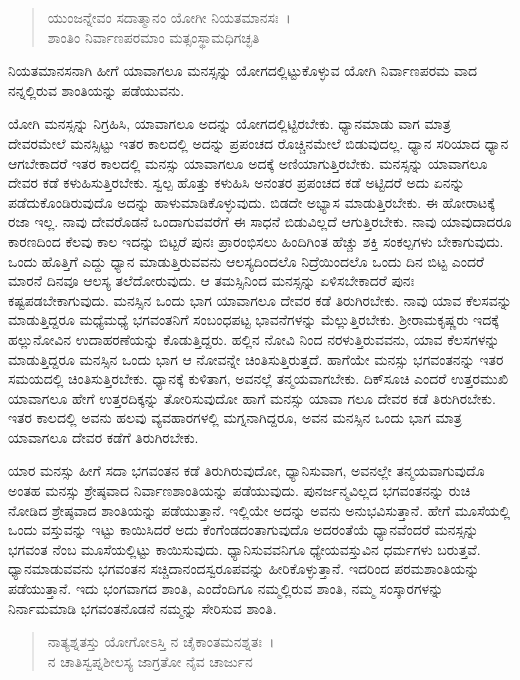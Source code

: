 \begin{verse}
ಯುಂಜನ್ನೇವಂ ಸದಾತ್ಮಾನಂ ಯೋಗೀ ನಿಯತಮಾನಸಃ~।\\ಶಾಂತಿಂ ನಿರ್ವಾಣಪರಮಾಂ ಮತ್ಸಂಸ್ಥಾಮಧಿಗಚ್ಛತಿ 
\end{verse}

{\small ನಿಯತಮಾನಸನಾಗಿ ಹೀಗೆ ಯಾವಾಗಲೂ ಮನಸ್ಸನ್ನು ಯೋಗದಲ್ಲಿಟ್ಟುಕೊಳ್ಳುವ ಯೋಗಿ ನಿರ್ವಾಣಪರಮ ವಾದ ನನ್ನಲ್ಲಿರುವ ಶಾಂತಿಯನ್ನು ಪಡೆಯುವನು.}

ಯೋಗಿ ಮನಸ್ಸನ್ನು ನಿಗ್ರಹಿಸಿ, ಯಾವಾಗಲೂ ಅದನ್ನು ಯೋಗದಲ್ಲಿಟ್ಟಿರಬೇಕು. ಧ್ಯಾನಮಾಡು ವಾಗ ಮಾತ್ರ ದೇವರಮೇಲೆ ಮನಸ್ಸಿಟ್ಟು ಇತರ ಕಾಲದಲ್ಲಿ ಅದನ್ನು ಪ್ರಪಂಚದ ರೊಚ್ಚಿನಮೇಲೆ ಬಿಡುವುದಲ್ಲ. ಧ್ಯಾನ ಸರಿಯಾದ ಧ್ಯಾನ ಆಗಬೇಕಾದರೆ ಇತರ ಕಾಲದಲ್ಲಿ ಮನಸ್ಸು ಯಾವಾಗಲೂ ಅದಕ್ಕೆ ಅಣಿಯಾಗುತ್ತಿರಬೇಕು. ಮನಸ್ಸನ್ನು ಯಾವಾಗಲೂ ದೇವರ ಕಡೆ ಕಳುಹಿಸುತ್ತಿರಬೇಕು. ಸ್ವಲ್ಪ ಹೊತ್ತು ಕಳುಹಿಸಿ ಅನಂತರ ಪ್ರಪಂಚದ ಕಡೆ ಅಟ್ಟಿದರೆ ಅದು ಏನನ್ನು ಪಡೆದುಕೊಂಡಿರುವುದೊ ಅದನ್ನು ಹಾಳುಮಾಡಿಕೊಳ್ಳುವುದು. ಬಿಡದೇ ಅಭ್ಯಾಸ ಮಾಡುತ್ತಿರಬೇಕು. ಈ ಹೋರಾಟಕ್ಕೆ ರಜಾ ಇಲ್ಲ. ನಾವು ದೇವರೊಡನೆ ಒಂದಾಗುವವರೆಗೆ ಈ ಸಾಧನೆ ಬಿಡುವಿಲ್ಲದೆ ಆಗುತ್ತಿರಬೇಕು. ನಾವು ಯಾವುದಾದರೂ ಕಾರಣದಿಂದ ಕೆಲವು ಕಾಲ ಇದನ್ನು ಬಿಟ್ಟರೆ ಪುನಃ ಪ್ರಾರಂಭಿಸಲು ಹಿಂದಿಗಿಂತ ಹೆಚ್ಚು ಶಕ್ತಿ ಸಂಕಲ್ಪಗಳು ಬೇಕಾಗುವುದು. ಒಂದು ಹೊತ್ತಿಗೆ ಎದ್ದು ಧ್ಯಾನ ಮಾಡುತ್ತಿರುವವನು ಆಲಸ್ಯದಿಂದಲೊ ನಿದ್ರೆಯಿಂದಲೊ ಒಂದು ದಿನ ಬಿಟ್ಟ ಎಂದರೆ ಮಾರನೆ ದಿನವೂ ಆಲಸ್ಯ ತಲೆದೋರುವುದು. ಆ ತಮಸ್ಸಿನಿಂದ ಮನಸ್ಸನ್ನು ಏಳಿಸಬೇಕಾದರೆ ಪುನಃ ಕಷ್ಟಪಡಬೇಕಾಗುವುದು. ಮನಸ್ಸಿನ ಒಂದು ಭಾಗ ಯಾವಾಗಲೂ ದೇವರ ಕಡೆ ತಿರುಗಿರಬೇಕು. ನಾವು ಯಾವ ಕೆಲಸವನ್ನು ಮಾಡುತ್ತಿದ್ದರೂ ಮಧ್ಯೆಮಧ್ಯೆ ಭಗವಂತನಿಗೆ ಸಂಬಂಧಪಟ್ಟ ಭಾವನೆಗಳನ್ನು ಮೆಲ್ಲುತ್ತಿರಬೇಕು. ಶ‍್ರೀರಾಮಕೃಷ್ಣರು ಇದಕ್ಕೆ ಹಲ್ಲುನೋವಿನ ಉದಾಹರಣೆಯನ್ನು ಕೊಡುತ್ತಿದ್ದರು. ಹಲ್ಲಿನ ನೋವಿ ನಿಂದ ನರಳುತ್ತಿರುವವನು, ಯಾವ ಕೆಲಸಗಳನ್ನು ಮಾಡುತ್ತಿದ್ದರೂ ಮನಸ್ಸಿನ ಒಂದು ಭಾಗ ಆ ನೋವನ್ನೇ ಚಿಂತಿಸುತ್ತಿರುತ್ತದೆ. ಹಾಗೆಯೇ ಮನಸ್ಸು ಭಗವಂತನನ್ನು ಇತರ ಸಮಯದಲ್ಲಿ ಚಿಂತಿಸುತ್ತಿರಬೇಕು. ಧ್ಯಾನಕ್ಕೆ ಕುಳಿತಾಗ, ಅವನಲ್ಲೆ ತನ್ಮಯವಾಗಬೇಕು. ದಿಕ್​ಸೂಚಿ ಎಂದರೆ ಉತ್ತರಮುಖಿ ಯಾವಾಗಲೂ ಹೇಗೆ ಉತ್ತರದಿಕ್ಕನ್ನು ತೋರಿಸುವುದೋ ಹಾಗೆ ಮನಸ್ಸು ಯಾವಾ ಗಲೂ ದೇವರ ಕಡೆ ತಿರುಗಿರಬೇಕು. ಇತರ ಕಾಲದಲ್ಲಿ ಅವನು ಹಲವು ವ್ಯವಹಾರಗಳಲ್ಲಿ ಮಗ್ನನಾಗಿದ್ದರೂ, ಅವನ ಮನಸ್ಸಿನ ಒಂದು ಭಾಗ ಮಾತ್ರ ಯಾವಾಗಲೂ ದೇವರ ಕಡೆಗೆ ತಿರುಗಿರಬೇಕು.

ಯಾರ ಮನಸ್ಸು ಹೀಗೆ ಸದಾ ಭಗವಂತನ ಕಡೆ ತಿರುಗಿರುವುದೋ, ಧ್ಯಾನಿಸುವಾಗ, ಅವನಲ್ಲೇ ತನ್ಮಯವಾಗುವುದೊ ಅಂತಹ ಮನಸ್ಸು ಶ್ರೇಷ್ಠವಾದ ನಿರ್ವಾಣಶಾಂತಿಯನ್ನು ಪಡೆಯುವುದು. ಪುನರ್ಜನ್ಮವಿಲ್ಲದ ಭಗವಂತನನ್ನು ರುಚಿ ನೋಡಿದ ಶ್ರೇಷ್ಠವಾದ ಶಾಂತಿಯನ್ನು ಪಡೆಯುತ್ತಾನೆ. ಇಲ್ಲಿಯೇ ಅದನ್ನು ಅವನು ಅನುಭವಿಸುತ್ತಾನೆ. ಹೇಗೆ ಮೂಸೆಯಲ್ಲಿ ಒಂದು ವಸ್ತುವನ್ನು ಇಟ್ಟು ಕಾಯಿಸಿದರೆ ಅದು ಕೆಂಗೆಂಡದಂತಾಗುವುದೊ ಅದರಂತೆಯೆ ಧ್ಯಾನವೆಂದರೆ ಮನಸ್ಸನ್ನು ಭಗವಂತ ನೆಂಬ ಮೂಸೆಯಲ್ಲಿಟ್ಟು ಕಾಯಿಸುವುದು. ಧ್ಯಾನಿಸುವವನಿಗೂ ಧ್ಯೇಯವಸ್ತುವಿನ ಧರ್ಮಗಳು ಬರುತ್ತವೆ. ಧ್ಯಾನಮಾಡುವವನು ಭಗವಂತನ ಸಚ್ಚಿದಾನಂದಸ್ವರೂಪವನ್ನು ಹೀರಿಕೊಳ್ಳುತ್ತಾನೆ. ಇದರಿಂದ ಪರಮಶಾಂತಿಯನ್ನು ಪಡೆಯುತ್ತಾನೆ. ಇದು ಭಂಗವಾಗದ ಶಾಂತಿ, ಎಂದೆಂದಿಗೂ ನಮ್ಮಲ್ಲಿರುವ ಶಾಂತಿ, ನಮ್ಮ ಸಂಸ್ಕಾರಗಳನ್ನು ನಿರ್ನಾಮಮಾಡಿ ಭಗವಂತನೊಡನೆ ನಮ್ಮನ್ನು ಸೇರಿಸುವ ಶಾಂತಿ.

\begin{verse}
ನಾತ್ಯಶ್ನತಸ್ತು ಯೋಗೋಽಸ್ತಿ ನ ಚೈಕಾಂತಮನಶ್ನತಃ~।\\ನ ಚಾತಿಸ್ವಪ್ನಶೀಲಸ್ಯ ಜಾಗ್ರತೋ ನೈವ ಚಾರ್ಜುನ 
\end{verse}

